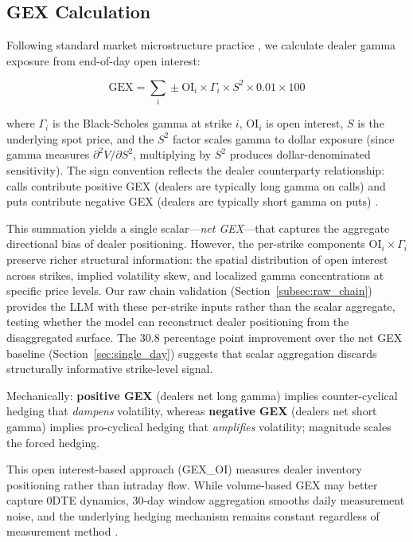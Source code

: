 \subsection{GEX Calculation}

Following standard market microstructure practice \citep{anderegg2022impact,spotgamma2021}, we calculate dealer gamma exposure from end-of-day open interest:

\begin{equation}
\text{GEX} = \sum_i \pm \text{OI}_i \times \Gamma_i \times S^2 \times 0.01 \times 100
\end{equation}

\noindent where $\Gamma_i$ is the Black-Scholes gamma \citep{black1973pricing} at strike $i$, $\text{OI}_i$ is open interest, $S$ is the underlying spot price, and the $S^2$ factor scales gamma to dollar exposure (since gamma measures $\partial^2 V / \partial S^2$, multiplying by $S^2$ produces dollar-denominated sensitivity). The sign convention reflects the dealer counterparty relationship: calls contribute positive GEX (dealers are typically long gamma on calls) and puts contribute negative GEX (dealers are typically short gamma on puts) \citep{garleanu2009demand,spotgamma2021}.

This summation yields a single scalar---\textit{net GEX}---that captures the aggregate directional bias of dealer positioning. However, the per-strike components $\text{OI}_i \times \Gamma_i$ preserve richer structural information: the spatial distribution of open interest across strikes, implied volatility skew, and localized gamma concentrations at specific price levels. Our raw chain validation (Section~\ref{subsec:raw_chain}) provides the LLM with these per-strike inputs rather than the scalar aggregate, testing whether the model can reconstruct dealer positioning from the disaggregated surface. The 30.8 percentage point improvement over the net GEX baseline (Section~\ref{sec:single_day}) suggests that scalar aggregation discards structurally informative strike-level signal.

Mechanically: \textbf{positive GEX} (dealers net long gamma) implies counter-cyclical hedging that \textit{dampens} volatility, whereas \textbf{negative GEX} (dealers net short gamma) implies pro-cyclical hedging that \textit{amplifies} volatility; magnitude scales the forced hedging.

This open interest-based approach (GEX\_OI) measures dealer inventory positioning rather than intraday flow. While volume-based GEX may better capture 0DTE dynamics, 30-day window aggregation smooths daily measurement noise, and the underlying hedging mechanism remains constant regardless of measurement method \citep{adams2025zerodte}.

